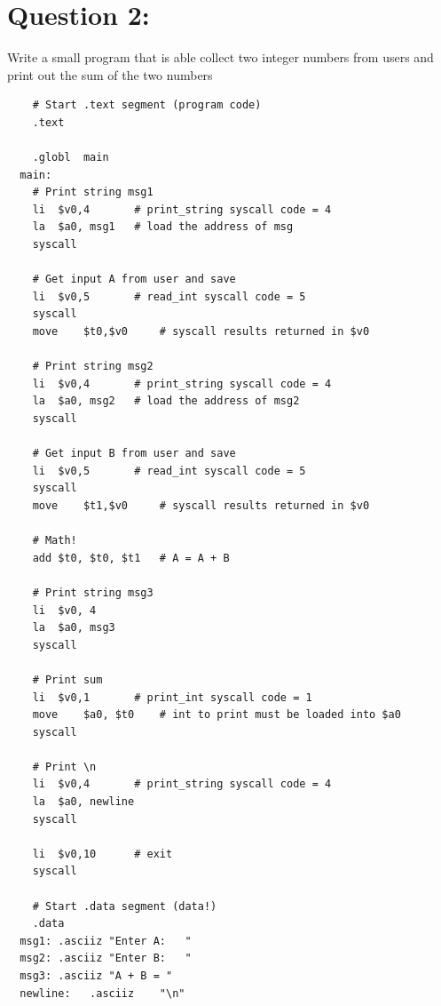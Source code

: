 \documentclass[12pt,a4paper]{article}
\begin{document}
\section*{Question 2:}Write a small program that is able collect two integer numbers from users and print out the
sum of the two numbers

\begin{mdframed}[hidealllines=true,backgroundcolor=magenta!10]
  \begin{lstlisting}
    # Start .text segment (program code)
    .text

    .globl	main
  main:
    # Print string msg1
    li	$v0,4		# print_string syscall code = 4
    la	$a0, msg1	# load the address of msg
    syscall

    # Get input A from user and save
    li	$v0,5		# read_int syscall code = 5
    syscall
    move	$t0,$v0		# syscall results returned in $v0

    # Print string msg2
    li	$v0,4		# print_string syscall code = 4
    la	$a0, msg2	# load the address of msg2
    syscall

    # Get input B from user and save
    li	$v0,5		# read_int syscall code = 5
    syscall
    move	$t1,$v0		# syscall results returned in $v0

    # Math!
    add	$t0, $t0, $t1	# A = A + B

    # Print string msg3
    li	$v0, 4
    la	$a0, msg3
    syscall

    # Print sum
    li	$v0,1		# print_int syscall code = 1
    move	$a0, $t0	# int to print must be loaded into $a0
    syscall

    # Print \n
    li	$v0,4		# print_string syscall code = 4
    la	$a0, newline
    syscall

    li	$v0,10		# exit
    syscall

    # Start .data segment (data!)
    .data
  msg1:	.asciiz	"Enter A:   "
  msg2:	.asciiz	"Enter B:   "
  msg3:	.asciiz	"A + B = "
  newline:   .asciiz	"\n"

          \end{lstlisting}
\end{mdframed}

\end{document}
